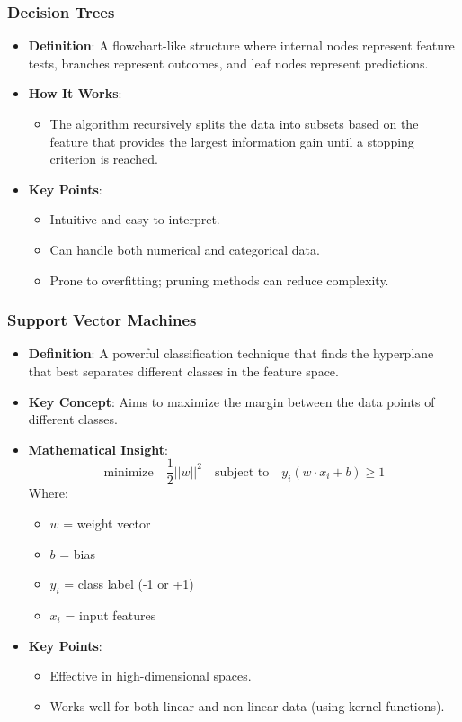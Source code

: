 \documentclass{beamer}
\begin{document}
\begin{frame}[fragile]
    \frametitle{Decision Trees}
    \begin{itemize}
        \item \textbf{Definition}: A flowchart-like structure where internal nodes represent feature tests, branches represent outcomes, and leaf nodes represent predictions.
        \item \textbf{How It Works}:
        \begin{itemize}
            \item The algorithm recursively splits the data into subsets based on the feature that provides the largest information gain until a stopping criterion is reached.
        \end{itemize}
        \item \textbf{Key Points}:
        \begin{itemize}
            \item Intuitive and easy to interpret.
            \item Can handle both numerical and categorical data.
            \item Prone to overfitting; pruning methods can reduce complexity.
        \end{itemize}
    \end{itemize}
\end{frame}

\begin{frame}[fragile]
    \frametitle{Support Vector Machines}
    \begin{itemize}
        \item \textbf{Definition}: A powerful classification technique that finds the hyperplane that best separates different classes in the feature space.
        \item \textbf{Key Concept}: Aims to maximize the margin between the data points of different classes.
        \item \textbf{Mathematical Insight}:
        \begin{equation}
        \text{minimize} \quad \frac{1}{2} ||w||^2 \quad \text{subject to} \quad y_i(w \cdot x_i + b) \geq 1
        \end{equation}
        Where:
        \begin{itemize}
            \item $w$ = weight vector
            \item $b$ = bias
            \item $y_i$ = class label (-1 or +1)
            \item $x_i$ = input features
        \end{itemize}
        \item \textbf{Key Points}:
        \begin{itemize}
            \item Effective in high-dimensional spaces.
            \item Works well for both linear and non-linear data (using kernel functions).
        \end{itemize}
    \end{itemize}
\end{frame}
\end{document}
